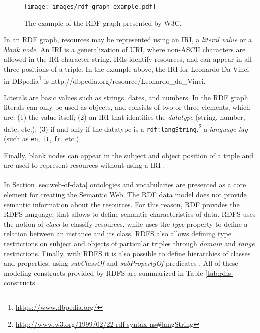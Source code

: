 \begin{figure}[!ht]
    \centering
    \texttt{[image: images/rdf-graph-example.pdf]}
    \caption{The example of the \ac{RDF} graph presented by \ac{W3C}.}
    \label{fig:rdf-graph-examle}
\end{figure}

In an \ac{RDF} graph, resources may be represented using an \ac{IRI}, a \textit{literal value} or a \textit{blank node}. An \ac{IRI} is a generalization of \ac{URI}, where non-\acs{ASCII} characters are allowed in the \ac{IRI} character string. \acp{IRI} identify resources, and can appear in all three positions of a triple. In the example above, the \ac{IRI} for Leonardo Da Vinci in DBpedia\footnote{\url{https://www.dbpedia.org/}} is \url{http://dbpedia.org/resource/Leonardo_da_Vinci}.

Literals are basic values such as strings, dates, and numbers. In the \ac{RDF} graph literals can only be used as objects, and consists of two or three elements, which are: (1) the value itself; (2) an \ac{IRI} that identifies the \textit{datatype} (string, number, date, etc.); (3) if and only if the datatype is a \texttt{rdf:langString},\footnote{\url{http://www.w3.org/1999/02/22-rdf-syntax-ns\#langString}} a \textit{language tag} (such as \texttt{en}, \texttt{it}, \texttt{fr}, etc.) \cite{world2014rdfconcepts}.

Finally, blank nodes can appear in the subject and object position of a triple and are used to represent resources without using a \ac{IRI} \cite{world2014rdfprimer}.

\paragraph*{}
In Section \ref{sec:web-of-data} ontologies and vocabularies are presented as a core element for creating the Semantic Web. The \ac{RDF} data model does not provide semantic information about the resources. For this reason, \ac{RDF} provides the \ac{RDFS} language, that allows to define semantic characteristics of data. \acl{RDFS} uses the notion of \textit{class} to classify resources, while uses the \textit{type} property to define a relation between an instance and its class. \acl{RDFS} also allows defining type restrictions on subject and objects of particular triples through \textit{domain} and \textit{range} restrictions. Finally, with \acl{RDFS} it is also possible to define hierarchies of classes and properties, using \textit{subClassOf} and \textit{subPropertyOf} predicates \cite{world2014rdfprimer}. All of these modeling constructs provided by \acl{RDFS} are summarized in Table \ref{tab:rdfs-constructs}.

